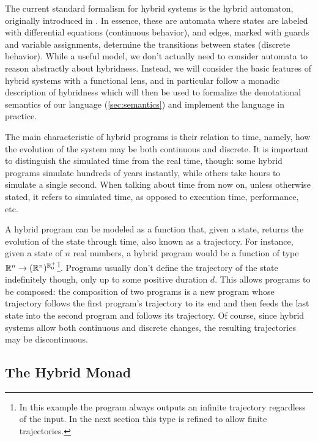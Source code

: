 The current standard formalism for hybrid systems is the hybrid automaton, originally introduced in \cite{Wit66}. In essence, these are automata where states are labeled with differential equations (continuous behavior), and edges, marked with guards and variable assignments, determine the transitions between states (discrete behavior). While a useful model, we don't actually need to consider automata to reason abstractly about hybridness. Instead, we will consider the basic features of hybrid systems with a functional lens, and in particular follow a monadic description of hybridness which will then be used to formalize the denotational semantics of our language (\cref{sec:semantics}) and implement the language in practice.

The main characteristic of hybrid programs is their relation to time, namely, how the evolution of the system may be both continuous and discrete. It is important to distinguish the simulated time from the real time, though: some hybrid programs simulate hundreds of years instantly, while others take hours to simulate a single second. When talking about time from now on, unless otherwise stated, it refers to simulated time, as opposed to execution time, performance, etc.

A hybrid program can be modeled as a function that, given a state, returns the evolution of the state through time, also known as a trajectory. For instance, given a state of $n$ real numbers, a hybrid program would be a function of type $\mathbb{R}^n \rightarrow (\mathbb{R}^n)^{\mathbb{R}_0^+}$\footnote{In this example the program always outputs an infinite trajectory regardless of the input. In the next section this type is refined to allow finite trajectories.}. Programs usually don't define the trajectory of the state indefinitely though, only up to some positive duration $d$. This allows programs to be composed: the composition of two programs is a new program whose trajectory follows the first program's trajectory to its end and then feeds the last state into the second program and follows its trajectory. Of course, since hybrid systems allow both continuous and discrete changes, the resulting trajectories may be discontinuous.

\subsection{The Hybrid Monad}
\label{sec:hybrid_monad}


